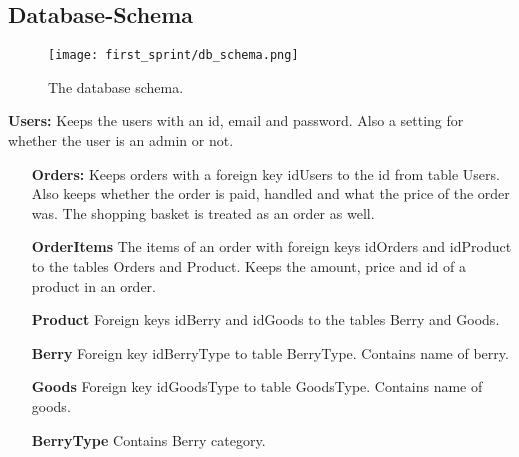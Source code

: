 \newpage

\subsection{Database-Schema}

\begin{figure}[H]
  \centering
  \texttt{[image: first\_sprint/db\_schema.png]}
  \caption{\label{fig:schema} The database schema.}
\end{figure}

\textbf{Users:} Keeps the users with an id, email and password. Also a
setting for whether the user is an admin or not.

\begin{itemize}
  \item[\textbf{Orders:}] Keeps orders with a foreign key idUsers to the
    id from table Users. Also keeps whether the order is paid, handled and
    what the price of the order was. The shopping basket is treated as an
    order as well.
  \item[\textbf{OrderItems}] The items of an order with foreign keys
    idOrders and idProduct to the tables Orders and Product.  Keeps the
    amount, price and id of a product in an order.
  \item[\textbf{Product}] Foreign keys idBerry and idGoods to the tables
    Berry and Goods.
  \item[\textbf{Berry}] Foreign key idBerryType to table BerryType. Contains
    name of berry.
  \item[\textbf{Goods}] Foreign key idGoodsType to table GoodsType. Contains
    name of goods.
  \item[\textbf{BerryType}] Contains Berry category.
\end{itemize}
